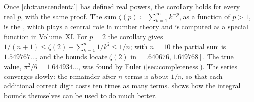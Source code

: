 Once \cref{ch:transcendental} has defined real powers, the corollary holds for every real $p$, with the same proof. The sum $\zeta(p)\coloneqq\sum_{k=1}^\infty k^{-p}$, as a function of $p>1$, is the , which plays a central role in number theory and is computed as a special function in Volume~XI. For $p=2$ the corollary gives $1/(n+1)\le\zeta(2)-\sum_{k=1}^n1/k^2\le1/n$; with $n=10$ the partial sum is $1.549767\ldots$, and the bounds locate $\zeta(2)$ in $[1.640676,1.649768]$. The true value, $\pi^2/6=1.644934\ldots$, was found by Euler (\cref{sec:completeness}). The series converges slowly: the remainder after $n$ terms is about $1/n$, so that each additional correct digit costs ten times as many terms.  shows how the integral bounds themselves can be used to do much better.

